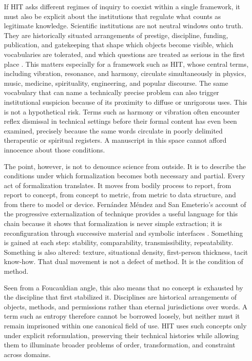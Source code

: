If HIT asks different regimes of inquiry to coexist within a single framework, it must also be explicit about the institutions that regulate what counts as legitimate knowledge. Scientific institutions are not neutral windows onto truth. They are historically situated arrangements of prestige, discipline, funding, publication, and gatekeeping that shape which objects become visible, which vocabularies are tolerated, and which questions are treated as serious in the first place \parencite{foucault_1980, foucault_1990}. This matters especially for a framework such as HIT, whose central terms, including vibration, resonance, and harmony, circulate simultaneously in physics, music, medicine, spirituality, engineering, and popular discourse. The same vocabulary that can name a technically precise problem can also trigger institutional suspicion because of its proximity to diffuse or unrigorous uses. This is not a hypothetical risk. Terms such as harmony or vibration often encounter reflex dismissal in technical settings before their formal content has even been examined, precisely because the same words circulate in poorly delimited therapeutic or spiritual registers. A manuscript in this space cannot afford innocence about those conditions.

The point, however, is not to denounce science from outside. It is to describe the conditions under which formalization becomes both necessary and partial. Every act of formalization translates. It moves from bodily process to report, from report to concept, from concept to metric, from metric to data structure, and from there to model or device. Fern\'andez M\'endez and San Emeterio's account of the progressive externalization of technique provides a useful language for this chain because it shows that formalization is never simple extraction; it is reconfiguration through successive material and symbolic interfaces \parencite{fernandez_2021b}. Something is gained at each step: stability, comparability, transmissibility, repeatability. Something is also altered: texture, situational density, first-person thickness, tacit know-how. That dual movement is not a defect of method. It is the condition of method.

Seen from a Foucauldian angle, this also means that no concept is exhausted by the discipline that first stabilized it. Disciplines are historical arrangements of objects, methods, and permissions rather than eternal jurisdictions over words. A term such as entropy therefore cannot be borrowed loosely, but neither must it remain imprisoned within one canonical field of use. HIT uses such concepts only under explicit reformulation, preserving their technical histories while allowing them to illuminate broader problems of order, transformation, and constraint across domains.

